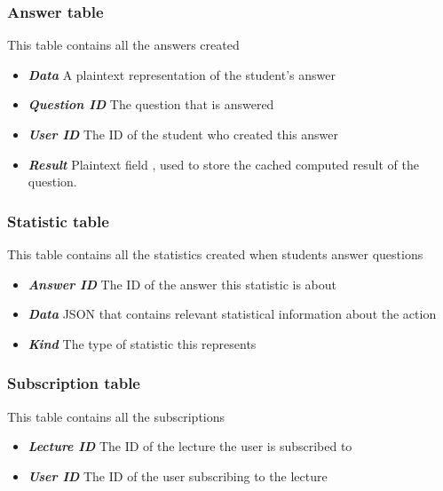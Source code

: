 \subsubsection{Answer table}
This table contains all the answers created

\begin{itemize}
	\item  \textit{\textbf{Data}} A plaintext representation of the student's answer
	\item  \textit{\textbf{Question ID}} The question that is answered
	\item  \textit{\textbf{User ID}} The ID of the student who created this answer
	\item  \textit{\textbf{Result}} Plaintext field , used to store the cached computed result of the question.
\end{itemize}

\subsubsection{Statistic table}
This table contains all the statistics created when students answer questions

\begin{itemize}
	\item  \textit{\textbf{Answer ID}} The ID of the answer this statistic is about
	\item  \textit{\textbf{Data}} JSON that contains relevant statistical information about the action
	\item  \textit{\textbf{Kind}} The type of statistic this represents
\end{itemize}



\subsubsection{Subscription table}
This table contains all the subscriptions

\begin{itemize}
	\item  \textit{\textbf{Lecture ID}} The ID of the lecture the user is subscribed to
	\item  \textit{\textbf{User ID}} The ID of the user subscribing to the lecture
\end{itemize}





















